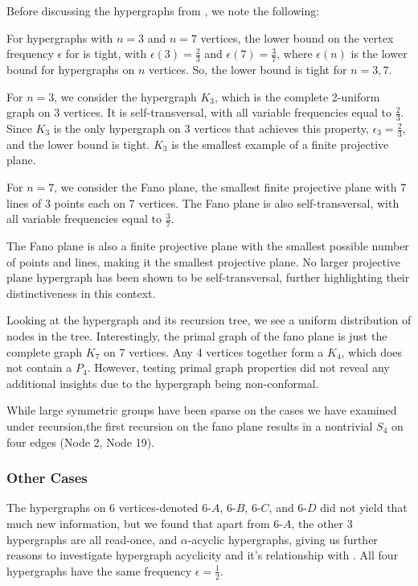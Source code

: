 Before discussing the hypergraphs from \cite{SS24}, we note the following:

\begin{observation}\label{obs:fano-tight}
For hypergraphs with $n=3$ and $n=7$ vertices, the lower bound on the vertex frequency $\epsilon$ for \FKA{} is tight, with $\epsilon(3)=\frac{2}{3}$ and $\epsilon(7)=\frac{3}{7}$, where $\epsilon(n)$ is the lower bound for hypergraphs on $n$ vertices. So, the lower bound is tight for $n=3,7$.
\end{observation}

For $n=3$, we consider the hypergraph $K_3$, which is the complete 2-uniform graph on 3 vertices. It is self-transversal, with all variable frequencies equal to $\frac{2}{3}$. Since $K_3$ is the only hypergraph on 3 vertices that achieves this property, $\epsilon_3=\frac{2}{3}$, and the lower bound is tight. $K_3$ is the smallest example of a finite projective plane.

For $n=7$, we consider the Fano plane, the smallest finite projective plane with 7 lines of 3 points each on 7 vertices. The Fano plane is also self-transversal, with all variable frequencies equal to $\frac{3}{7}$.

The Fano plane is also a finite projective plane with the smallest possible number of points and lines, making it the smallest projective plane. No larger projective plane hypergraph has been shown to be self-transversal, further highlighting their distinctiveness in this context.

Looking at the hypergraph and its recursion tree, we see a uniform distribution of nodes in the tree. Interestingly, the primal graph of the fano plane is just the complete graph $K_7$ on 7 vertices. Any 4 vertices together form a $K_4$, which does not contain a $P_4$. However, testing primal graph properties did not reveal any additional insights due to the hypergraph being non-conformal.

While large symmetric groups have been sparse on the cases we have examined under \FKA{} recursion,the first recursion on the fano plane results in a nontrivial $S_4$ on four edges (Node 2, Node 19).

\subsubsection*{Other Cases}

The hypergraphs on 6 vertices-denoted 6-$A$, 6-$B$, 6-$C$, and 6-$D$ did not yield that much new information, but we found that apart from 6-$A$, the other 3 hypergraphs are all read-once, and $\alpha$-acyclic hypergraphs, giving us further reasons to investigate hypergraph acyclicity and it's relationship with \FKA. All four hypergraphs have the same frequency $\epsilon=\frac{1}{2}$.

